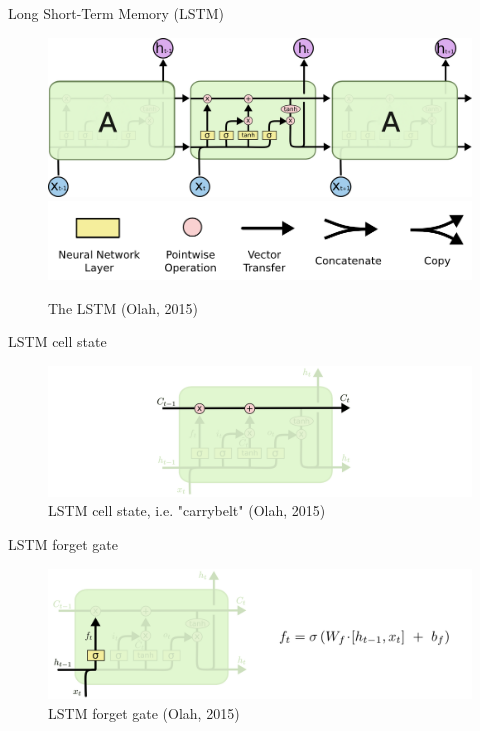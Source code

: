 \documentclass[10pt]{beamer}
\begin{document}
\begin{frame}{Long Short-Term Memory (LSTM)}

\begin{figure}[h]
\centering
\includegraphics[width=1\textwidth]{fig/Olah_LSTM1.png}
\includegraphics[width=1\textwidth]{fig/Olah_LSTM1b.png}
\caption{The LSTM (Olah, 2015)}
\end{figure}

\end{frame}


\begin{frame}{LSTM cell state}

\begin{figure}[h]
\centering
\includegraphics[width=1\textwidth]{fig/Olah_LSTM2.png}
\caption{LSTM cell state, i.e. "carrybelt" (Olah, 2015)}
\end{figure}

\end{frame}

\begin{frame}{LSTM forget gate}

\begin{figure}[h]
\centering
\includegraphics[width=1\textwidth]{fig/Olah_LSTM3_forget.png}
\caption{LSTM forget gate (Olah, 2015)}
\end{figure}

\end{frame}
\end{document}

